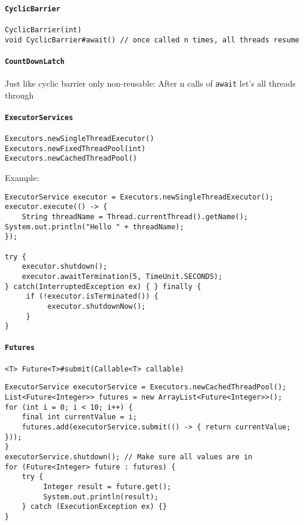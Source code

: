 \paragraph{\texttt{CyclicBarrier}}
\begin{verbatim}
CyclicBarrier(int)
void CyclicBarrier#await() // once called n times, all threads resume
\end{verbatim}
\paragraph{\texttt{CountDownLatch}}
Just like cyclic barrier only non-reusable: After n calls of \texttt{await} let's all threads through

\paragraph{\texttt{ExecutorServices}}
\begin{verbatim}
Executors.newSingleThreadExecutor()
Executors.newFixedThreadPool(int)
Executors.newCachedThreadPool()
\end{verbatim}
Example:
\begin{verbatim}
ExecutorService executor = Executors.newSingleThreadExecutor(); executor.execute(() -> {
    String threadName = Thread.currentThread().getName(); System.out.println("Hello " + threadName);
});

try {
    executor.shutdown();
    executor.awaitTermination(5, TimeUnit.SECONDS);
} catch(InterruptedException ex) { } finally {
     if (!executor.isTerminated()) {
          executor.shutdownNow();
     } 
}
\end{verbatim}
\paragraph{\texttt{Futures}}
\begin{verbatim}
<T> Future<T>#submit(Callable<T> callable)
\end{verbatim}
 
\begin{verbatim}
ExecutorService executorService = Executors.newCachedThreadPool(); 
List<Future<Integer>> futures = new ArrayList<Future<Integer>>(); 
for (int i = 0; i < 10; i++) {
    final int currentValue = i;
    futures.add(executorService.submit(() -> { return currentValue; }));
}
executorService.shutdown(); // Make sure all values are in
for (Future<Integer> future : futures) { 
    try {
         Integer result = future.get();
         System.out.println(result);
    } catch (ExecutionException ex) {}
} 
\end{verbatim}

